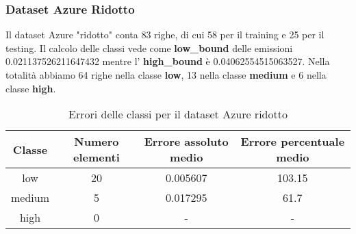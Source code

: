\subsubsection{Dataset Azure Ridotto}

Il dataset Azure "ridotto" conta 83 righe, di cui 58 per il training e 25 per il testing.
Il calcolo delle classi vede come \textbf{low\_bound} delle emissioni 0.021137526211647432 mentre l' \textbf{high\_bound} è 0.04062554515063527.
Nella totalità abbiamo 64 righe nella classe \textbf{low}, 13 nella classe \textbf{medium} e 6 nella classe \textbf{high}.


\begin{table}[H]
    \centering
    \begin{tabular}{|c|c|c|c|}
        \hline
        \textbf{Classe} &  \textbf{Numero elementi} & \textbf{Errore assoluto medio} & \textbf{Errore percentuale medio} \\ \hline
        low             & 20                & 0.005607                   & 103.15            \\ \hline
        medium          & 5                & 0.017295                  & 61.7            \\ \hline
        high            & 0                & -                   & -            \\ \hline
    \end{tabular}
    \caption{Errori delle classi per il dataset Azure ridotto}
\end{table}








